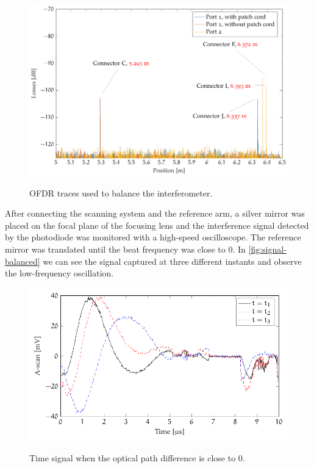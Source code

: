 \begin{figure}[hbt]
	\myfloatalign
	{	\includegraphics[width=\linewidth]{gfx/ch3/obr-balancing}}
	\caption{OFDR traces used to balance the interferometer.}\label{fig:obr-balancing}
\end{figure}

After connecting the scanning system and the reference arm, a silver mirror was placed on the focal plane of the focusing lens and the interference signal detected by the photodiode was monitored with a high-speed oscilloscope. The reference mirror was translated until the beat frequency was close to 0. In \autoref{fig:signal-balanced} we can see the signal captured at three different instants and observe the low-frequency oscillation. 


\begin{figure}[hbt]
	\myfloatalign
	{	\includegraphics[width=\linewidth]{gfx/tikz/balancing/balanced}}
	\caption{Time signal when the optical path difference is close to 0.}\label{fig:signal-balanced}
\end{figure}

